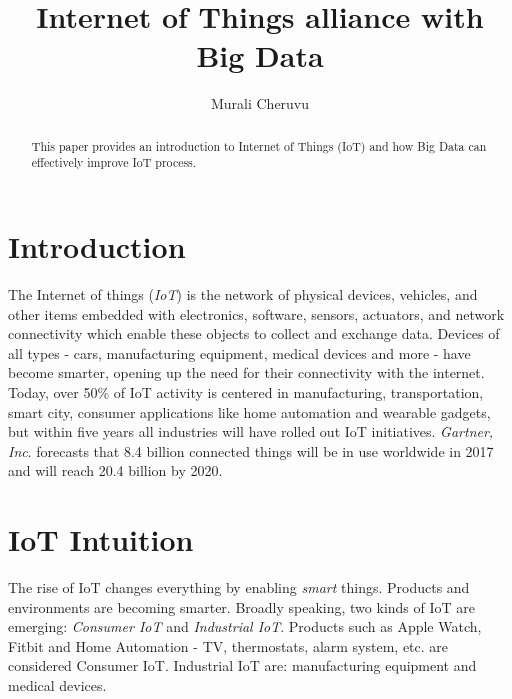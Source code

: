 \documentclass[sigconf]{acmart}
\begin{document}
\title{Internet of Things alliance with Big Data}


\author{Murali Cheruvu}

\renewcommand{\shortauthors}{M. Cheruvu}


\begin{abstract}
This paper provides an introduction to Internet of Things (IoT) and how Big Data can effectively improve IoT process.
\end{abstract}



\maketitle

\section{Introduction}

The Internet of things ({\em IoT}) is the network of physical devices, vehicles, and other items embedded with electronics, software, sensors, actuators, and network connectivity which enable these objects to collect and exchange data\cite{1_wiki_iot}. Devices of all types - cars, manufacturing equipment, medical devices and more - have become smarter, opening up the need for their connectivity with the internet. Today, over 50\% of IoT activity is centered in manufacturing, transportation, smart city, consumer applications like home automation and wearable gadgets, but within five years all industries will have rolled out IoT initiatives. {\em Gartner, Inc}. forecasts that 8.4 billion connected things will be in use worldwide in 2017 and will reach 20.4 billion by 2020\cite{2_Gartner}. 

\section{IoT Intuition}

The rise of IoT changes everything by enabling {\em smart} things. Products and environments are becoming smarter. Broadly speaking, two kinds of IoT are emerging: {\em Consumer IoT} and {\em Industrial IoT}. Products such as Apple Watch, Fitbit and Home Automation - TV, thermostats, alarm system, etc. are considered Consumer IoT. Industrial IoT are: manufacturing equipment and medical devices.
\end{document}
